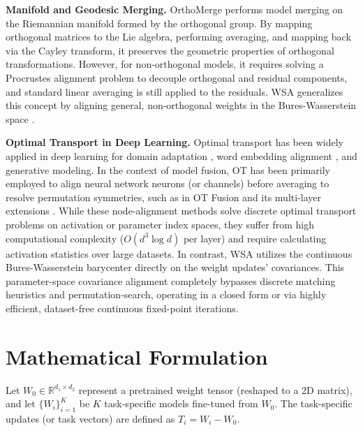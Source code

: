 \documentclass{article}
\theoremstyle{plain}
\theoremstyle{definition}
\theoremstyle{remark}
\begin{document}
\textbf{Manifold and Geodesic Merging.} OrthoMerge \cite{orthomerge} performs model merging on the Riemannian manifold formed by the orthogonal group. By mapping orthogonal matrices to the Lie algebra, performing averaging, and mapping back via the Cayley transform, it preserves the geometric properties of orthogonal transformations. However, for non-orthogonal models, it requires solving a Procrustes alignment problem to decouple orthogonal and residual components, and standard linear averaging is still applied to the residuals. WSA generalizes this concept by aligning general, non-orthogonal weights in the Bures-Wasserstein space \cite{bhatia19, gelbrich90, dowson82}.

\textbf{Optimal Transport in Deep Learning.} Optimal transport has been widely applied in deep learning for domain adaptation \cite{courty16}, word embedding alignment \cite{alvarez20}, and generative modeling. In the context of model fusion, OT has been primarily employed to align neural network neurons (or channels) before averaging to resolve permutation symmetries, such as in OT Fusion \cite{singh20} and its multi-layer extensions \cite{wang20}. While these node-alignment methods solve discrete optimal transport problems on activation or parameter index spaces, they suffer from high computational complexity ($O(d^3 \log d)$ per layer) and require calculating activation statistics over large datasets. In contrast, WSA utilizes the continuous Bures-Wasserstein barycenter \cite{agueh11, bures69} directly on the weight updates' covariances. This parameter-space covariance alignment completely bypasses discrete matching heuristics and permutation-search, operating in a closed form or via highly efficient, dataset-free continuous fixed-point iterations.

\section{Mathematical Formulation}
\label{submission-method}

Let $W_0 \in \mathbb{R}^{d_1 \times d_2}$ represent a pretrained weight tensor (reshaped to a 2D matrix), and let $\{W_i\}_{i=1}^K$ be $K$ task-specific models fine-tuned from $W_0$. The task-specific updates (or task vectors) are defined as $T_i = W_i - W_0$. 
\end{document}
